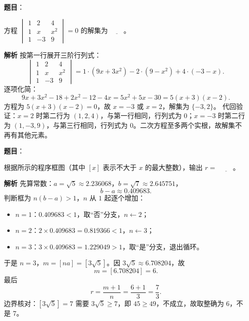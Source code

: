 \begin{answer}

\textbf{题目}：

方程 $\begin{vmatrix}1&2&4\\1&x&x^2\\1&-3&9\end{vmatrix}=0$ 的解集为 $\underline{\qquad}$。

\textbf{解析}
按第一行展开三阶行列式：
\nopagebreak[4]
\[\begin{vmatrix}1&2&4\\1&x&x^2\\1&-3&9\end{vmatrix}
=1\cdot\left(9x+3x^2\right)-2\cdot\left(9-x^2\right)+4\cdot\left(-3-x\right).\]
逐项化简：
\nopagebreak[4]
\[9x+3x^2-18+2x^2-12-4x=5x^2+5x-30=5\left(x+3\right)\left(x-2\right).\]
方程为 $5(x+3)(x-2)=0$，故 $x=-3$ 或 $x=2$，解集为 $\{-3,2\}$。
代回验证：$x=2$ 时第二行为 $(1,2,4)$，与第一行相同，行列式为 $0$；$x=-3$ 时第二行为 $(1,-3,9)$，与第三行相同，行列式为 $0$。二次方程至多两个实根，故解集不再有其他元素。


\end{answer}
\begin{answer}

\textbf{题目}：

根据所示的程序框图（其中 $[x]$ 表示不大于 $x$ 的最大整数），输出 $r=$ $\underline{\qquad}$。
\nopagebreak[4]
\begin{center}\end{center}
\nopagebreak[4]
\textbf{解析}
先算常数：$a=\sqrt5\approx2.236068$，$b=\sqrt7\approx2.645751$，
\nopagebreak[4]
\[b-a\approx0.409683.\]
判断框为 $n(b-a)>1$，$n$ 从 $1$ 起逐个增加：

\begin{itemize}
\item $n=1$：$0.409683<1$，取“否”分支，$n\leftarrow2$；
\item $n=2$：$2\times0.409683=0.819366<1$，$n\leftarrow3$；
\item $n=3$：$3\times0.409683=1.229049>1$，取“是”分支，退出循环。
\end{itemize}

于是 $n=3$，$m=[na]=[3\sqrt5]$。因 $3\sqrt5\approx6.708204$，故
\nopagebreak[4]
\[m=[6.708204]=6.\]
最后
\nopagebreak[4]
\[r=\frac{m+1}{n}=\frac{6+1}{3}=\frac73.\]
边界核对：$[3\sqrt5]=7$ 需要 $3\sqrt5\ge7$，即 $45\ge49$，不成立，故取整确为 $6$，不是 $7$。


\end{answer}
